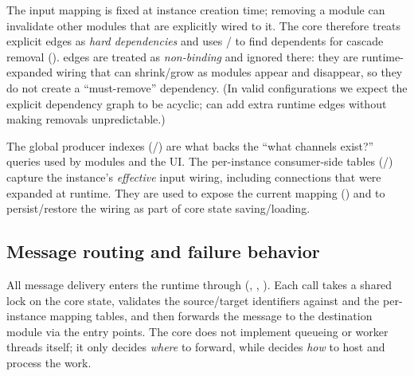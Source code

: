 The input mapping is fixed at instance creation time; removing a module can invalidate other modules that are explicitly wired to it.
The core therefore treats explicit edges as \emph{hard dependencies} and uses / to find dependents for cascade removal ().
 edges are treated as \emph{non-binding} and ignored there: they are runtime-expanded wiring that can shrink/grow as modules appear and disappear, so they do not create a ``must-remove'' dependency.
(In valid configurations we expect the explicit dependency graph to be acyclic;  can add extra runtime edges without making removals unpredictable.)


The global producer indexes (/) are what backs the ``what channels exist?'' queries used by modules and the UI.
The per-instance consumer-side tables (/) capture the instance's \emph{effective} input wiring, including  connections that were expanded at runtime.
They are used to expose the current mapping () and to persist/restore the wiring as part of core state saving/loading.


\subsection{Message routing and failure behavior} \label{subsec:ch3_core_routing}

All message delivery enters the runtime through  (, , ).
Each call takes a shared lock on the core state, validates the source/target identifiers against  and the per-instance mapping tables, and then forwards the message to the destination module via the  entry points.
The core does not implement queueing or worker threads itself; it only decides \emph{where} to forward, while  decides \emph{how} to host and process the work.

